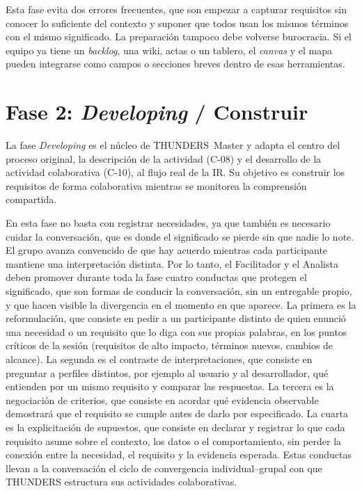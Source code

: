 \documentclass[12pt,letterpaper,oneside]{report}
\begin{document}
Esta fase evita dos errores frecuentes, que son empezar a capturar requisitos sin
conocer lo suficiente del contexto y suponer que todos usan los mismos términos
con el mismo significado. La preparación tampoco debe volverse burocracia. Si el
equipo ya tiene un \textit{backlog}, una wiki, actas o un tablero, el
\textit{canvas} y el mapa pueden integrarse como campos o secciones breves
dentro de esas herramientas.

\section{Fase 2: \textit{Developing} / Construir}
\label{sec:fase2}
La fase \textit{Developing} es el núcleo de THUNDERS~Master y adapta el centro
del proceso original, la descripción de la actividad (C-08) y el desarrollo de
la actividad colaborativa (C-10), al flujo real de la IR. Su objetivo es
construir los requisitos de forma colaborativa mientras se monitorea la
comprensión compartida.

En esta fase no basta con registrar necesidades, ya que también es necesario
cuidar la conversación, que es donde el significado se pierde sin que nadie lo
note. El grupo avanza convencido de que hay acuerdo mientras cada participante
mantiene una interpretación distinta. Por lo tanto, el Facilitador y el
Analista deben promover durante toda la fase cuatro conductas que protegen el
significado, que son formas de conducir la conversación, sin un entregable
propio, y que hacen visible la divergencia en el momento en que aparece. La
primera es la reformulación, que consiste en pedir a un participante distinto
de quien enunció una necesidad o un requisito que lo diga con sus propias
palabras, en los puntos críticos de la sesión (requisitos de alto impacto,
términos nuevos, cambios de alcance). La segunda es el contraste de
interpretaciones, que consiste en preguntar a perfiles distintos, por ejemplo al
usuario y al desarrollador, qué entienden por un mismo requisito y comparar las
respuestas. La tercera es la negociación de criterios, que consiste en acordar
qué evidencia observable demostrará que el requisito se cumple antes de darlo
por especificado. La cuarta es la explicitación de supuestos, que consiste en
declarar y registrar lo que cada requisito asume sobre el contexto, los datos o
el comportamiento, sin perder la conexión entre la necesidad, el requisito y la
evidencia esperada. Estas conductas llevan a la conversación el ciclo de
convergencia individual--grupal con que THUNDERS estructura sus actividades
colaborativas.
\end{document}
